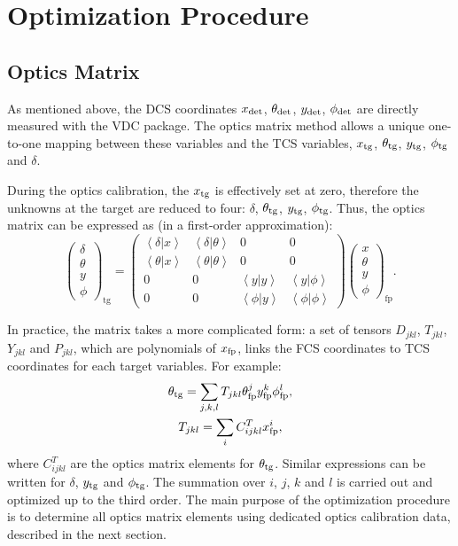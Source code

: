 \section{Optimization Procedure}
\label{C6S2}

\subsection{Optics Matrix}
\label{C6S2SS1}

As mentioned above, the DCS coordinates $x_{\mathrm{det}}$, $\theta_{\mathrm{det}}$, $y_{\mathrm{det}}$, $\phi_{\mathrm{det}}$ are directly measured with the VDC package. The optics matrix method allows a unique one-to-one mapping between these variables and the TCS variables, $x_{\mathrm{tg}}$, $\theta_{\mathrm{tg}}$, $y_{\mathrm{tg}}$, $\phi_{\mathrm{tg}}$ and $\delta$.

 During the optics calibration, the $x_{\mathrm{tg}}$ is effectively set at zero, therefore the unknowns at the target are reduced to four: $\delta$, $\theta_{\mathrm{tg}}$, $y_{\mathrm{tg}}$, $\phi_{\mathrm{tg}}$. Thus, the optics matrix can be expressed as (in a first-order approximation):
\begin{equation} \label{C6S2SS1E1}
\left(
\begin{matrix} \delta \\ \theta \\ y \\ \phi \end{matrix}
\right)_{\mathrm{tg}} = \left(
\begin{matrix}
\left<\delta|x\right> & \left<\delta|\theta\right> & 0 & 0 \\
\left<\theta|x\right> & \left<\theta|\theta\right> & 0 & 0 \\
0 & 0 & \left<y|y\right> & \left<y|\phi\right> \\
0 & 0 & \left<\phi|y\right> & \left<\phi|\phi\right>
\end{matrix}
\right)
\left(\begin{matrix} x \\ \theta \\ y \\ \phi \end{matrix}
\right)_{\mathrm{fp}}.
\end{equation}

In practice, the matrix takes a more complicated form: a set of tensors $D_{jkl}$, $T_{jkl}$, $Y_{jkl}$ and $P_{jkl}$, which are polynomials of $x_{\mathrm{fp}}$, links the FCS coordinates to TCS coordinates for each target variables. For example:
\begin{gather} \label{C6S2SS1E2}
\theta_{\mathrm{tg}} = \sum_{j,k,l} T_{jkl} \theta_{\mathrm{fp}}^j y_{\mathrm{fp}}^k \phi_{\mathrm{fp}}^l, \\ \label{C6S2SS1E3}
T_{jkl} = \sum_i C_{ijkl}^{T} x_{\mathrm{fp}}^i,
\end{gather}
where $C_{ijkl}^{T}$ are the optics matrix elements for $\theta_{\mathrm{tg}}$. Similar expressions can be written for $\delta$, $y_{\mathrm{tg}}$ and $\phi_{\mathrm{tg}}$. The summation over $i$, $j$, $k$ and $l$ is carried out and optimized up to the third order. The main purpose of the optimization procedure is to determine all optics matrix elements using dedicated optics calibration data, described in the next section.

